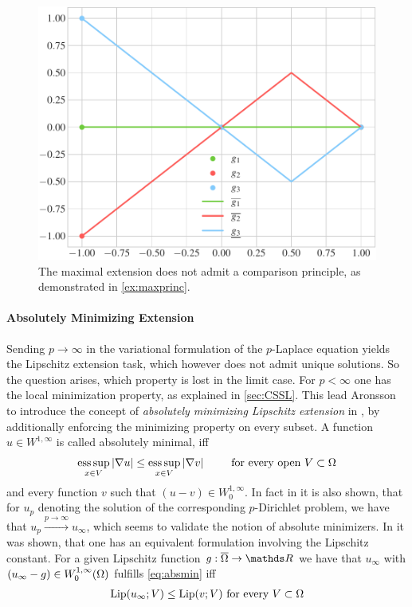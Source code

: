 %
\begin{figure}
\centering
\includegraphics[width=.5\textwidth]{code/lipextcomp/comp.pdf}
\caption[Visualization for \cref{ex:maxprinc}.]{The maximal extension does not admit a comparison principle, as demonstrated in \cref{ex:maxprinc}.}\label{fig:maxprinc}
\end{figure}
%
%
\paragraph{Absolutely Minimizing Extension}\label{sec:AMLE}
%
Sending $p\to\infty$ in the variational formulation of the $p$-Laplace equation 
yields the Lipschitz extension task, which however does not admit unique solutions. So the question arises, which property is lost in the limit case. For $p<\infty$ one has the local minimization property, as explained in \cref{sec:CSSL}. This lead Aronsson to introduce the concept of \emph{absolutely minimizing Lipschitz extension} in \cite{aronsson1967extension}, by additionally enforcing the minimizing property on every subset. A function $u\in W^{1,\infty}$ is called absolutely minimal, iff
%
\begin{align}\label{eq:absmin}
\operatorname*{ess\,sup}_{x\in V} \left|\nabla u\right| \leq \operatorname*{ess\,sup}_{x\in V} \left|\nabla v\right| \qquad\text{ for every open } V\subset \Omega
\end{align}
%
and every function $v$ such that $(u-v)\in W^{1,\infty}_0$. In fact in \cite{aronsson1967extension} it is also shown, that for $u_p$ denoting the solution of the corresponding $p$-Dirichlet problem, we have that 
$u_p\xrightarrow{p\to\infty} u_\infty$, which seems to validate the notion of absolute minimizers. In \cite{aronsson2004tour} it was shown, that one has an equivalent formulation involving the Lipschitz constant. For a given Lipschitz function $g:\overline{\domain}\to\R$ we have that $u_\infty$ with $(u_\infty-g)\in W^{1,\infty}_0(\Omega)$ fulfills \cref{eq:absmin} iff
%
\begin{align*}
\operatorname{Lip}(u_\infty; V) \leq \operatorname{Lip}(v; V) \text{ for every } V\subset \Omega
\end{align*}
